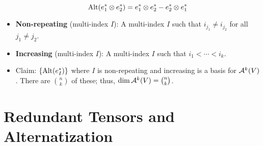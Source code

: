 \documentclass[../notes.tex]{subfiles}
\begin{document}
\begin{itemize}
\begin{equation*}
        \Alt(e_1^*\otimes e_2^*) = e_1^*\otimes e_2^*-e_2^*\otimes e_1^*
    \end{equation*}
    \item \textbf{Non-repeating} (multi-index $I$): A multi-index $I$ such that $i_{j_1}\neq i_{j_2}$ for all $j_1\neq j_2$.
    \item \textbf{Increasing} (multi-index $I$): A multi-index $I$ such that $i_1<\cdots<i_k$.
    \item Claim: $\{\Alt(e_I^*)\}$ where $I$ is non-repeating and increasing is a basis for $\alt[k]{V}$. There are $\binom{n}{k}$ of these; thus, $\dim\alt[k]{V}=\binom{n}{k}$.
\end{itemize}



\section{Redundant Tensors and Alternatization}
\end{document}
